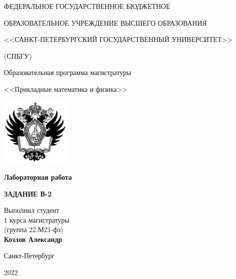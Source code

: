 \begin{titlepage}
	\begin{center}
	{\textsc{ФЕДЕРАЛЬНОЕ ГОСУДАРСТВЕННОЕ БЮДЖЕТНОЕ}}
	
	{\textsc{ОБРАЗОВАТЕЛЬНОЕ УЧРЕЖДЕНИЕ ВЫСШЕГО ОБРАЗОВАНИЯ}}
	
	{\textsc{<<САНКТ-ПЕТЕРБУРГСКИЙ ГОСУДАРСТВЕННЫЙ УНИВЕРСИТЕТ>>}}
	
	{\textsc{(СПБГУ)}}
	
	\vspace{1cm}
    {\large{Образовательная программа магистратуры}}
    
    {\large{<<Прикладные математика и физика>>}}
	\vspace{1cm}
	
	\includegraphics[width=0.25\textwidth]{fig/logo.png}
	
	\vspace{2cm}
	{\Large\textbf{Лабораторная работа}}
	
	\vspace{0.25cm}
	{\Large\textbf{ЗАДАНИЕ В-2}}

	\vspace{3cm}
	\begin{flushright}
	Выполнил студент\\
	1 курса магистратуры\\
	(группа 22.М21-фз)\\
	\textbf{Козлов Александр}
	\end{flushright}

	\end{center}

	\vfill

	\begin{center}
	{Санкт-Петербург}
	
	{2022}
	\end{center}
\end{titlepage}